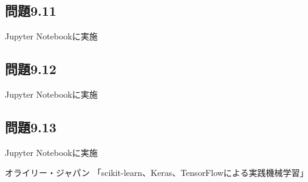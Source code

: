 \documentclass[a4j,twocolumn]{jsarticle}
\begin{document}
\subsection{問題9.11}
Jupyter Notebookに実施

\subsection{問題9.12}
Jupyter Notebookに実施

\subsection{問題9.13}
Jupyter Notebookに実施


\begin{thebibliography}{}
オライリー・ジャパン 「scikit-learn、Keras、TensorFlowによる実践機械学習」
\end{thebibliography}
\end{document}
